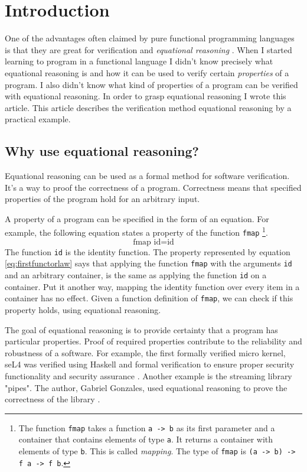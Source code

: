 \section{Introduction}
\label{sec:This}

One of the advantages often claimed by pure functional programming languages is that they are great for \gls{verification} and \emph{equational reasoning} \cite{Wadler87}.
When I started learning to program in a functional language I didn't know precisely what equational reasoning is and how it can be used to verify certain \emph{properties} of a program. I also didn't know what kind of properties of a program can be verified with equational reasoning. In order to grasp equational reasoning I wrote this article.
This article describes the verification method equational reasoning by a practical example. 

\subsection{Why use equational reasoning?}

Equational reasoning can be used as a formal method for software verification. It's a way to proof the correctness of a program. Correctness means that specified properties of the program hold for an arbitrary input. 

A property of a program can be specified in the form of an equation. For example, the following equation states a property of the function \verb|fmap|  \footnote{The function \verb|fmap| takes a function \verb|a -> b| as its first parameter and a container that contains elements of type \verb|a|. It returns a container with elements of type \verb|b|. This is called \emph{mapping}. The type of \verb|fmap| is \verb|(a -> b) -> f a -> f b|.}.
\begin{equation}
  \label{eq:firstfunctorlaw}
\text{fmap } \text{id}  =  \text{id}  
\end{equation}
 The function \verb|id| is the identity function. The property represented by equation \ref{eq:firstfunctorlaw} says that applying the function \verb|fmap| with the arguments \verb|id| and an arbitrary container, is the same as applying the function \verb|id| on a container. Put it another way, mapping the identity function over every item in a container has no effect. Given a function definition of \verb|fmap|, we can check if this property holds, using equational reasoning.

The goal of equational reasoning is to provide certainty that a program has particular properties. Proof of required properties contribute to the reliability and robustness of a software. 
For example, the first formally verified micro kernel, seL4 was verified using Haskell and formal verification to ensure proper security functionality and security assurance \cite{Klein09}.
Another example is the streaming library "pipes". The author, Gabriel Gonzales, used equational reasoning to prove the correctness of the library \cite{gonzales13}.

